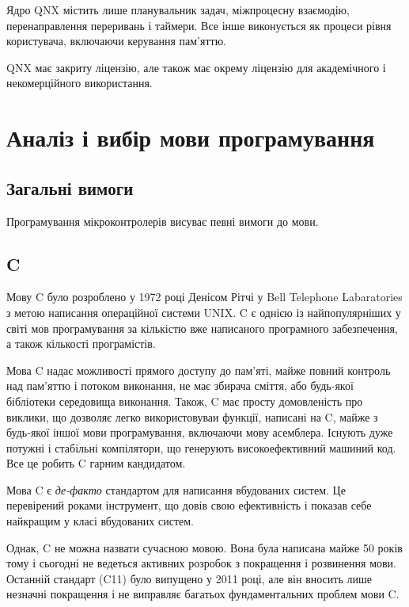 \documentclass[oneside,14pt,a4paper,final]{myextreport}
\begin{document}
Ядро QNX містить лише планувальник задач, міжпроцесну взаємодію, перенаправлення переривань і таймери. Все інше виконується як процеси рівня користувача, включаючи керування пам'яттю.

QNX має закриту ліцензію, але також має окрему ліцензію для академічного і некомерційного використання\cite{qnx:noncommercial}.


\chapter{Аналіз і вибір мови програмування}
\section{Загальні вимоги}

Програмування мікроконтролерів висуває певні вимоги до мови.

\section{C}

\newcommand\LangC{C}

Мову \LangC{} було розроблено у 1972 році Денісом Рітчі у Bell Telephone Labaratories з метою написання операційної системи UNIX\cite{stewart-bill:history-of-c}. \LangC{} є однією із найпопулярніших у світі мов програмування за кількістю вже написаного програмного забезпечення, а також кількості програмістів.

Мова \LangC{} надає можливості прямого доступу до пам'яті, майже повний контроль над пам'яттю і потоком виконання, не має збирача сміття, або будь-якої бібліотеки середовища виконання. Також, \LangC{} має просту домовленість про виклики, що дозволяє легко використовуваи функції, написані на \LangC{}, майже з будь-якої іншої мови програмування, включаючи мову асемблера. Існують дуже потужні і стабільні компілятори, що генерують високоефективний машиний код. Все це робить \LangC{} гарним кандидатом.

Мова \LangC{} є \emph{де-факто} стандартом для написання вбудованих систем. Це перевірений роками інструмент, що довів свою ефективність і показав себе найкращим у класі вбудованих систем.

Однак, \LangC{} не можна назвати сучасною мовою. Вона була написана майже 50 років тому і сьогодні не ведеться активних розробок з покращення і розвинення мови. Останній стандарт (C11) було випущено у 2011 році, але він вносить лише незначні покращення і не виправляє багатьох фундаментальних проблем мови \LangC{}.
\end{document}
